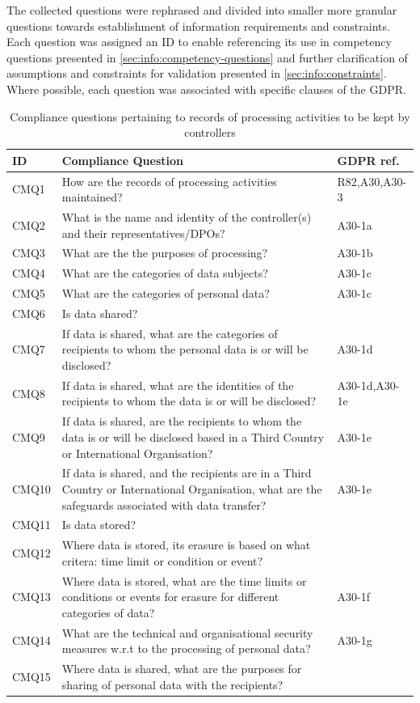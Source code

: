 The collected questions were rephrased and divided into smaller more granular questions towards establishment of information requirements and constraints. 
Each question was assigned an ID to enable referencing its use in competency questions presented in \autoref{sec:info:competency-questions} and further clarification of assumptions and constraints for validation presented in \autoref{sec:info:constraints}.
Where possible, each question was associated with specific clauses of the GDPR. 
\begin{table}
\small
\centering
\caption{Compliance questions pertaining to records of processing activities to be kept by controllers}\label{table:info:compliance-controllers}
\begin{tabularx}{\textwidth}{|l|X|l|}
\hline
\textbf{ID} & \textbf{Compliance Question} & \textbf{GDPR ref.} \\ \hline

CMQ1 & How are the records of processing activities maintained? & R82,A30,A30-3 \\ \hline
CMQ2 & What is the name and identity of the controller(s) and their representatives/DPOs? & A30-1a \\ \hline
CMQ3 & What are the the purposes of processing? & A30-1b \\ \hline
CMQ4 & What are the categories of data subjects? & A30-1c \\ \hline
CMQ5 & What are the categories of personal data? & A30-1c \\ \hline
CMQ6 & Is data shared? &  \\ \hline
CMQ7 & If data is shared, what are the categories of recipients to whom the personal data is or will be disclosed? & A30-1d \\ \hline
CMQ8 & If data is shared, what are the identities of the recipients to whom the data is or will be disclosed? & A30-1d,A30-1e \\ \hline
CMQ9 & If data is shared, are the recipients to whom the data is or will be disclosed based in a Third Country or International Organisation? & A30-1e \\ \hline
CMQ10 & If data is shared, and the recipients are in a Third Country or International Organisation, what are the safeguards associated with data transfer? & A30-1e \\ \hline
CMQ11 & Is data stored? &  \\ \hline
CMQ12 & Where data is stored, its erasure is based on what critera: time limit or condition or event? &  \\ \hline
CMQ13 & Where data is stored, what are the time limits or conditions or events for erasure for different categories of data? & A30-1f \\ \hline
CMQ14 & What are the technical and organisational security measures w.r.t to the processing of personal data? & A30-1g \\ \hline
CMQ15 & Where data is shared, what are the purposes for sharing of personal data with the recipients? &  \\ \hline
\end{tabularx}
\end{table}
